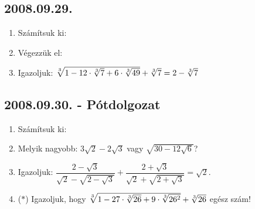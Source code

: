 \subsection*{2008.09.29.}
\begin{enumerate}
\item Számítsuk ki:
\item Végezzük el:
\item Igazoljuk: $\root3\of{1-12\cdot \root3\of{7}+6\cdot \root3\of{49}}+\root3\of{7}=2-\root3\of{7}$
\end{enumerate}

\subsection*{2008.09.30. - Pótdolgozat}
\begin{enumerate}
\item Számítsuk ki:
 \item Melyik nagyobb: $3\sqrt{2}-2\sqrt{3}$ vagy $\sqrt{30-12\sqrt{6}}$?
 \item Igazoljuk: $\dfrac{2-\sqrt{3}}{\sqrt{2}-\sqrt{2-\sqrt{3}}}+\dfrac{2+\sqrt{3}}{\sqrt{2}+\sqrt{2+\sqrt{3}}}=\sqrt{2}$.
 \item ($*$) Igazoljuk, hogy $\root3\of{1-27\cdot\root3\of{26}+9\cdot \root3\of{26^2}}+\root3\of{26}$ egész szám!
\end{enumerate}

